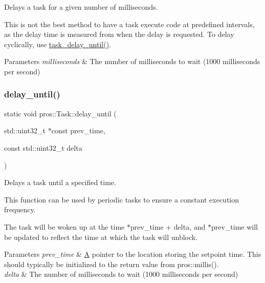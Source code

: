 Delays a task for a given number of milliseconds. 

This is not the best method to have a task execute code at predefined intervals, as the delay time is measured from when the delay is requested. To delay cyclically, use \mbox{\hyperlink{rtos_8h_a61c8ccf83a0dc79fc0e9fde5e87a0329}{task\+\_\+delay\+\_\+until()}}.


\begin{DoxyParams}{Parameters}
{\em milliseconds} & The number of milliseconds to wait (1000 milliseconds per second) \\
\hline
\end{DoxyParams}
\mbox{\label{classpros_1_1Task_aa038d0eeb973ce7fca8689fa5bb91fec}} 
\subsubsection{\texorpdfstring{delay\_until()}{delay\_until()}}
{\footnotesize\ttfamily static void pros\+::\+Task\+::delay\+\_\+until (\begin{DoxyParamCaption}\item[{std\+::uint32\+\_\+t $\ast$const}]{prev\+\_\+time,  }\item[{const std\+::uint32\+\_\+t}]{delta }\end{DoxyParamCaption})\hspace{0.3cm}{\ttfamily [static]}}



Delays a task until a specified time. 

This function can be used by periodic tasks to ensure a constant execution frequency.

The task will be woken up at the time $\ast$prev\+\_\+time + delta, and $\ast$prev\+\_\+time will be updated to reflect the time at which the task will unblock.


\begin{DoxyParams}{Parameters}
{\em prev\+\_\+time} & \mbox{\hyperlink{structA}{A}} pointer to the location storing the setpoint time. This should typically be initialized to the return value from pros\+::millis(). \\
\hline
{\em delta} & The number of milliseconds to wait (1000 milliseconds per second) \\
\hline
\end{DoxyParams}
\mbox{\label{classpros_1_1Task_a9b1eda960abda807cb8447075fc4ea44}} 
